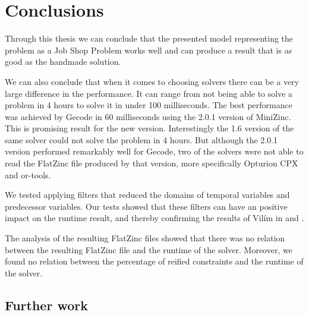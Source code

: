 \chapter{Conclusions} \label{cha:conc}
Through this thesis we can conclude that the presented model representing the problem as a Job Shop Problem works well and can produce a result that is as good as the handmade solution.

We can also conclude that when it comes to choosing solvers there can be a very large difference in the performance. It can range from not being able to solve a problem in 4 hours to solve it in under 100 milliseconds. The best performance was achieved by Gecode in 60 milliseconds using the 2.0.1 version of MiniZinc. This is promising result for the new version. Interestingly the 1.6 version of the same solver could not solve the problem in 4 hours. But although the 2.0.1 version performed remarkably well for Gecode, two of the solvers were not able to read the FlatZinc file produced by that version, more specifically Opturion CPX and or-tools.

We tested applying filters that reduced the domains of temporal variables and predecessor variables. Our tests showed that these filters can have an positive impact on the runtime result, and thereby confirming the results of Vilím in \cite{VilimBartak2002Batch} \cite{Vilim2002Precedence} and \cite{VilimBartak2002Sequence}.

The analysis of the resulting FlatZinc files showed that there was no relation between the resulting FlatZinc file and the runtime of the solver. Moreover, we found no relation between the percentage of reified constraints and the runtime of the solver.


\section{Further work}

